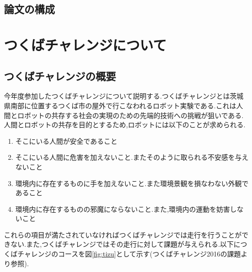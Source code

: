 \documentclass[12pt,oneside]{sotsuken_paper}
\begin{document}
\section{論文の構成}

\chapter{つくばチャレンジについて} 
\section{つくばチャレンジの概要} 
今年度参加したつくばチャレンジについて説明する.つくばチャレンジとは茨城県南部に位置するつくば市の屋外で行こなわれるロボット実験である.これは人間とロボットの共存する社会の実現のための先端的技術への挑戦が狙いである.人間とロボットの共存を目的とするため,ロボットには以下のことが求められる. 
\begin{enumerate} 
 \item そこにいる人間が安全であること 
\item そこにいる人間に危害を加えないこと.またそのように取られる不安感を与えないこと 
 \item 環境内に存在するものに手を加えないこと.また環境景観を損なわない外観であること 
\item 環境内に存在するものの邪魔にならないこと.また,環境内の運動を妨害しないこと 
\end{enumerate} 
これらの項目が満たされていなければつくばチャレンジでは走行を行うことができない.また,つくばチャレンジではその走行に対して課題が与えられる.以下につくばチャレンジのコースを図\ref{fig:tizu}として示す(つくばチャレンジ2016の課題より参照). 
\end{document}
